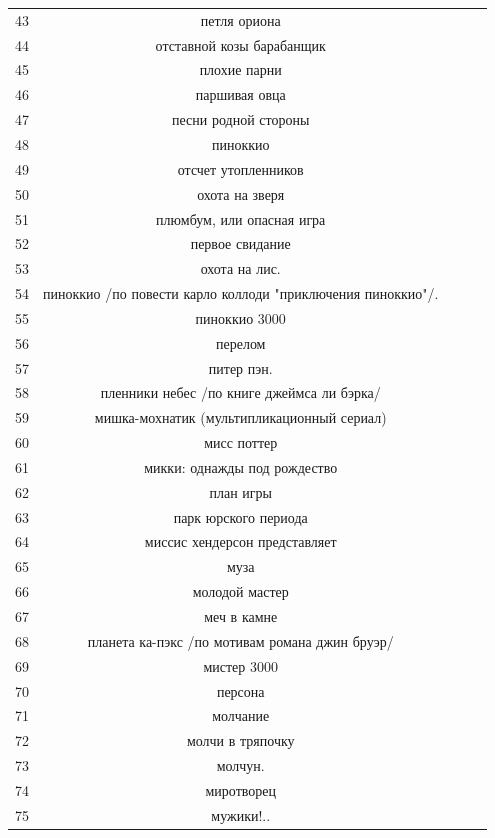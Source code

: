 \documentclass[12pt]{report}
\begin{document}
\begin{table}[H]
	\label{tab:v6}
	\begin{center}

		\begin{tabular}{|c@{\hspace{7mm}}|c@{\hspace{7mm}}|c@{\hspace{7mm}}|c|c|}
		\hline
43 & петля ориона \\
44 & отставной козы барабанщик \\
45 & плохие парни \\
46 & паршивая овца \\
47 & песни родной стороны \\
48 & пиноккио \\
49 & отсчет утопленников \\
50 & охота на зверя \\
51 & плюмбум, или опасная игра \\
52 & первое свидание \\
53 & охота на лис. \\
54 & пиноккио /по повести карло коллоди "приключения пиноккио"/. \\
55 & пиноккио 3000 \\
56 & перелом \\
57 & питер пэн. \\
58 & пленники небес /по книге джеймса ли бэрка/ \\
59 & мишка-мохнатик (мультипликационный сериал) \\
60 & мисс поттер \\
61 & микки: однажды под рождество \\
62 & план игры \\
63 & парк юрского периода \\
64 & миссис хендерсон представляет \\
65 & муза \\
66 & молодой мастер \\
67 & меч в камне \\
68 & планета ка-пэкс /по мотивам романа джин бруэр/ \\
69 & мистер 3000 \\
70 & персона \\
71 & молчание \\
72 & молчи в тряпочку \\
73 & молчун. \\
74 & миротворец \\
75 & мужики!.. \\

\end{tabular}
\end{center}
\end{table}
\end{document}
